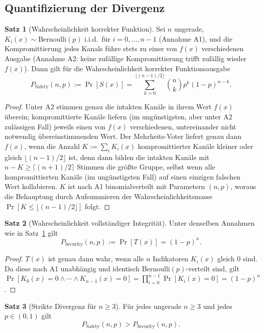 ﻿\documentclass[a4paper,12pt]{article}
\theoremstyle{definition}
\newtheorem{satz}{Satz}
\begin{document}
\subsection{Quantifizierung der Divergenz}

\begin{satz}[Wahrscheinlichkeit korrekter Funktion]
	\label{satz:pkorrekt}
	Sei $n$ ungerade, $K_i(x) \sim \mathrm{Bernoulli}(p)$ i.i.d.\ für $i=0,\ldots,n-1$ (Annahme A1), und die Kompromittierung jedes Kanals führe stets zu einer von $f(x)$ verschiedenen Ausgabe (Annahme A2: keine zufällige Kompromittierung trifft zufällig wieder $f(x)$). Dann gilt für die Wahrscheinlichkeit korrekter Funktionsausgabe
	\[
	P_{\mathrm{Safety}}(n,p) := \Pr[S(x)] = \sum_{k=0}^{\lfloor (n-1)/2 \rfloor} \binom{n}{k} p^k (1-p)^{n-k}.
	\]
\end{satz}

\begin{proof}
	Unter A2 stimmen genau die intakten Kanäle in ihrem Wert $f(x)$ überein; kompromittierte Kanäle liefern (im ungünstigsten, aber unter A2 zulässigen Fall) jeweils einen von $f(x)$ verschiedenen, untereinander nicht notwendig übereinstimmenden Wert. Der Mehrheits-Voter liefert genau dann $f(x)$, wenn die Anzahl $K := \sum_i K_i(x)$ kompromittierter Kanäle kleiner oder gleich $\lfloor (n-1)/2 \rfloor$ ist, denn dann bilden die intakten Kanäle mit $n-K \geq \lceil (n+1)/2 \rceil$ Stimmen die größte Gruppe, selbst wenn alle kompromittierten Kanäle (im ungünstigsten Fall) auf einen einzigen falschen Wert kollabieren. $K$ ist nach A1 binomialverteilt mit Parametern $(n,p)$, woraus die Behauptung durch Aufsummieren der Wahrscheinlichkeitsmasse $\Pr[K \leq \lfloor (n-1)/2\rfloor]$ folgt. \qedhere
\end{proof}

\begin{satz}[Wahrscheinlichkeit vollständiger Integrität]
	\label{satz:psecure}
	Unter denselben Annahmen wie in Satz~\ref{satz:pkorrekt} gilt
	\[
	P_{\mathrm{Security}}(n,p) := \Pr[T(x)] = (1-p)^n.
	\]
\end{satz}

\begin{proof}
	$T(x)$ ist genau dann wahr, wenn alle $n$ Indikatoren $K_i(x)$ gleich $0$ sind. Da diese nach A1 unabhängig und identisch $\mathrm{Bernoulli}(p)$-verteilt sind, gilt $\Pr[K_0(x)=0 \wedge \cdots \wedge K_{n-1}(x)=0] = \prod_{i=0}^{n-1}\Pr[K_i(x)=0] = (1-p)^n$. \qedhere
\end{proof}

\begin{satz}[Strikte Divergenz für $n \geq 3$]
	\label{satz:divergenz}
	Für jedes ungerade $n \geq 3$ und jedes $p \in (0,1)$ gilt
	\[
	P_{\mathrm{Safety}}(n,p) > P_{\mathrm{Security}}(n,p).
	\]
\end{satz}
\end{document}
